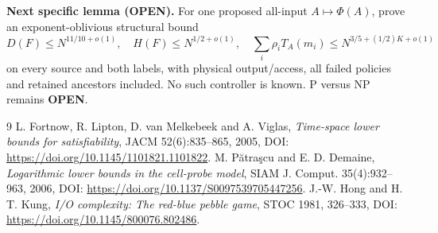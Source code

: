 \documentclass[11pt]{article}
\newcommand{\OPEN}{\textbf{OPEN}}
\begin{document}
\textbf{Next specific lemma (OPEN).}  For one proposed all-input
$A\mapsto\Phi(A)$, prove an exponent-oblivious structural bound
\[
D(F)\le N^{11/10+o(1)},\quad H(F)\le N^{1/2+o(1)},\quad
\sum_i\rho_iT_A(m_i)\le N^{3/5+(1/2)K+o(1)}
\]
on every source and both labels, with physical output/access, all failed
policies and retained ancestors included.  No such controller is known.
P versus NP remains \OPEN.

\begin{thebibliography}{9}
 L. Fortnow, R. Lipton, D. van Melkebeek and A. Viglas,
\emph{Time-space lower bounds for satisfiability}, JACM 52(6):835--865,
2005, DOI: \url{https://doi.org/10.1145/1101821.1101822}.
 M. P\u{a}tra\c{s}cu and E. D. Demaine,
\emph{Logarithmic lower bounds in the cell-probe model}, SIAM J. Comput.
35(4):932--963, 2006, DOI: \url{https://doi.org/10.1137/S0097539705447256}.
 J.-W. Hong and H. T. Kung,
\emph{I/O complexity: The red-blue pebble game}, STOC 1981, 326--333,
DOI: \url{https://doi.org/10.1145/800076.802486}.
\end{thebibliography}
\end{document}

